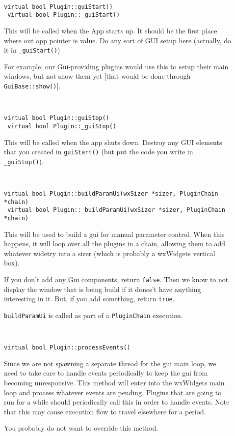 \begin{description}
\item[] \
\begin{lstlisting}[frame=single]
 virtual bool Plugin::guiStart()
 virtual bool Plugin::_guiStart()
\end{lstlisting}

This will be called when the App starts up. It should be the
first place where out app pointer is value. Do any sort of
GUI setup here (actually, do it in {\tt \_guiStart()})

For example, our Gui-providing plugins would use this to
setup their main windows, but not show them yet [that would
be done through {\tt GuiBase::show()}].


\item[] \
\begin{lstlisting}[frame=single]
 virtual bool Plugin::guiStop()
 virtual bool Plugin::_guiStop()
\end{lstlisting}

This will be called when the app shuts down. Destroy any
GUI elements that you created in {\tt guiStart()} (but put the
code you write in {\tt \_guiStop()}).


\item[] \
\begin{lstlisting}[frame=single]
 virtual bool Plugin::buildParamUi(wxSizer *sizer, PluginChain *chain)
 virtual bool Plugin::_buildParamUi(wxSizer *sizer, PluginChain *chain)
\end{lstlisting}

This will be used to build a gui for manual parameter control.
When this happens, it will loop over all the plugins in a chain,
allowing them to add whatever widetry into a sizer (which is probably
a wxWidgets vertical box).

If you don't add any Gui components, return {\tt false}. Then we know
to not display the window that is being build if it dones't have
anything interesting in it.
But, if you add something, return {\tt true}.
 
{\tt buildParamUi} is called as part of a {\tt PluginChain} execution. 

\item[] \
\begin{lstlisting}[frame=single]
 virtual bool Plugin::processEvents()
\end{lstlisting}

Since we are not spawning a separate thread for the gui main loop, we need
to take care to handle events periodically to keep the gui from becoming
unresponsive.  This method will enter into the wxWidgets main loop and 
process whatever events are pending. Plugins that are going to run for 
a while should periodically call this in order to handle events. Note that
this may cause execution flow to travel elsewhere for a period.

You probably do not want to override this method.


\end{description}




